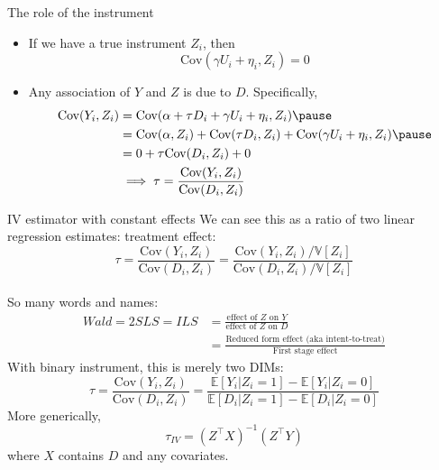 \documentclass[xcolor=dvipsnames]{beamer}
\newcommand{\E}{\mathbb{E}}
\newcommand{\V}{\mathbb{V}}
\begin{document}
\begin{frame}{The role of the instrument}
\begin{center}
\end{center}

\begin{itemize}[<+->]
\item
  If we have a true instrument \(Z_i\),  then \small \[\text{Cov}(\gamma U_i + \eta_i, Z_i) = 0\]
\item \normalsize Any association of $Y$ and $Z$ is due to $D$. Specifically,
  \pause[\thebeamerpauses]
  \small
  \[\begin{aligned}
  \text{Cov}(Y_i, Z_i) &= \text{Cov}(\alpha + \tau D_i + \gamma U_i + \eta_i, Z_i) \pause \\
  &= \text{Cov}(\alpha, Z_i) + \text{Cov}(\tau D_i, Z_i) + \text{Cov}(\gamma U_i + \eta_i, Z_i) \pause \\
  & = 0 + \tau \text{Cov}(D_i,Z_i) + 0 \\
  & \implies \tau =  \frac{\text{Cov}(Y_i, Z_i)}{\text{Cov}(D_i,Z_i) } 
  \end{aligned}\]
\end{itemize}

\end{frame}

\begin{frame}{IV estimator with constant effects}
\small
{} We can see this as a ratio of two linear regression estimates:
  treatment effect: \[
  \tau = \frac{\text{Cov}(Y_i, Z_i)}{\text{Cov}(D_i, Z_i)} = \frac{\text{Cov}(Y_i, Z_i)/\V[Z_i]}{\text{Cov}(D_i, Z_i)/\V[Z_i]} 
  \] \\
  \medskip
{} So many words and names:
\begin{align*}
Wald = 2SLS = ILS &= \frac{\text{effect of }Z \text{ on } Y} {\text{effect of }Z \text{ on } D} \\
&= \frac{\text{Reduced form effect (aka intent-to-treat)}}{\text{First stage effect}}
\end{align*}
 With binary instrument, this is merely two DIMs:
  \[
  \tau = \frac{\text{Cov}(Y_i, Z_i)}{\text{Cov}(D_i, Z_i)} = \frac{\E[Y_i|Z_i = 1] - \E[Y_i|Z_i = 0]}{\E[D_i|Z_i = 1] - \E[D_i | Z_i = 0]}
  \]
 More generically, $$\tau_{IV} = (Z^{\top}X)^{-1}(Z^{\top}Y)$$ where $X$ contains $D$ and any covariates.

\end{frame}
\end{document}
